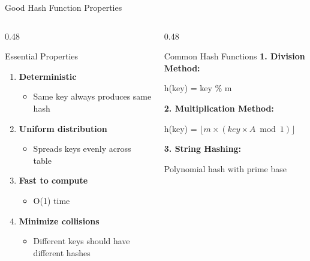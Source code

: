 \documentclass[aspectratio=169,xcolor=dvipsnames]{beamer}
\begin{document}
\begin{frame}{Good Hash Function Properties}
  \begin{columns}
    \begin{column}{0.48\textwidth}
      \begin{block}{Essential Properties}
        \begin{enumerate}
          \item \textbf{Deterministic}
          \begin{itemize}
            \item Same key always produces same hash
          \end{itemize}
          \item \textbf{Uniform distribution}
          \begin{itemize}
            \item Spreads keys evenly across table
          \end{itemize}
          \item \textbf{Fast to compute}
          \begin{itemize}
            \item O(1) time
          \end{itemize}
          \item \textbf{Minimize collisions}
          \begin{itemize}
            \item Different keys should have different hashes
          \end{itemize}
        \end{enumerate}
      \end{block}
    \end{column}
    \begin{column}{0.48\textwidth}
      \begin{block}{Common Hash Functions}
        \textbf{1. Division Method:}
        \begin{center}
          h(key) = key \% m
        \end{center}

        \vspace{0.2cm}

        \textbf{2. Multiplication Method:}
        \begin{center}
          h(key) = $\lfloor m \times (key \times A \bmod 1) \rfloor$
        \end{center}

        \vspace{0.2cm}

        \textbf{3. String Hashing:}
        \begin{center}
          Polynomial hash with prime base
        \end{center}
      \end{block}
    \end{column}
  \end{columns}
\end{frame}
\end{document}
